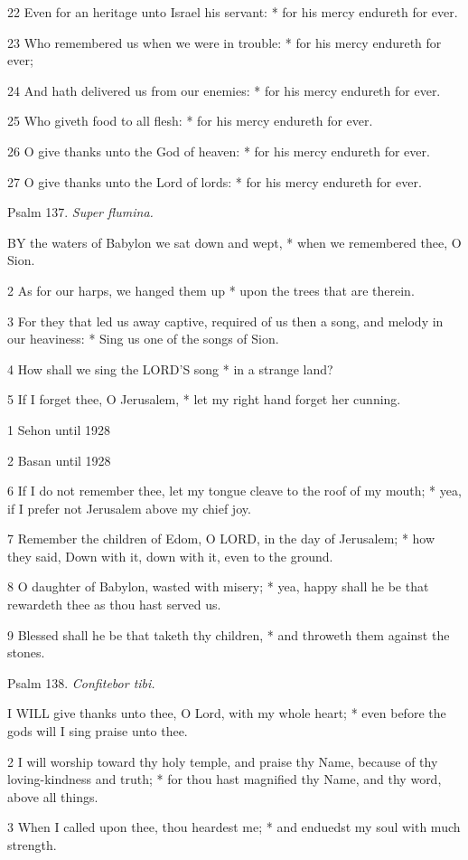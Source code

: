 22 Even for an heritage unto Israel his servant: *
for his mercy endureth for ever.

23 Who remembered us when we were in trouble: * for
his mercy endureth for ever;

24 And hath delivered us from our enemies: * for his
mercy endureth for ever.

25 Who giveth food to all flesh: * for his mercy endureth
for ever.

26 O give thanks unto the God of heaven: * for his
mercy endureth for ever.

27 O give thanks unto the Lord of lords: * for his
mercy endureth for ever.

Psalm
137. \emph{Super flumina.}

BY
the waters of Babylon we sat down and wept, * when we remembered thee,
O Sion.

2 As for our harps, we hanged them up * upon the trees
that are therein.

3 For they that led us away captive, required of us
then a song, and melody in our heaviness: * Sing us one of the songs of
Sion.

4 How shall we sing the LORD’S song * in a strange
land?

5 If I forget thee, O Jerusalem, * let my right hand
forget her cunning.

1 Sehon until
1928

2 Basan until
1928

6 If I do not remember thee, let my tongue cleave to the roof of my mouth;
* yea, if I prefer not Jerusalem above my chief joy.

7 Remember the children of Edom, O LORD, in the day of Jerusalem; * how
they said, Down with it, down with it, even to the ground.

8 O daughter of Babylon, wasted with misery; * yea,
happy shall he be that rewardeth thee as thou hast served us.

9 Blessed shall he be that taketh thy children, * and
throweth them against the stones.

Psalm
138. \emph{Confitebor tibi.}

I
WILL give thanks unto thee, O Lord, with my whole heart; * even before
the gods will I sing praise unto thee.

2 I will worship toward thy holy temple, and praise
thy Name, because of thy loving-kindness and truth; * for thou hast magnified
thy Name, and thy word, above all things.

3 When I called upon thee, thou heardest me; * and
enduedst my soul with much strength.

